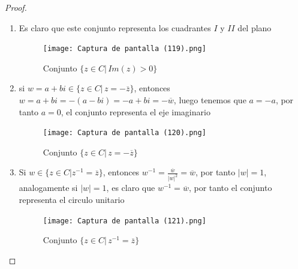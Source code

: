 \documentclass[11pt,letterpaper]{article}
\begin{document}
\begin{proof}\,\\
    \begin{enumerate}
        \item Es claro que este conjunto representa los cuadrantes $I$ y $II$ del plano
    \begin{figure}[htb]
    \centering
    \texttt{[image: Captura de pantalla (119).png]}
    \caption{Conjunto $\{z\in C|\,Im(z)>0\}$}
    \label{Cono rebanado}
\end{figure}
\item si $w=a+bi\in \{z\in C|\,z=-\overline{z}\}$, entonces $w=a+bi=-(a-bi)=-a+bi=-\overline{w}$, luego tenemos que $a=-a$, por tanto $a=0$,
el conjunto representa el eje imaginario
\begin{figure}[htb]
    \centering
    \texttt{[image: Captura de pantalla (120).png]}
    \caption{Conjunto $\{z\in C|\,z=-\overline{z}\}$ }
    \label{Cono rebanado}
\end{figure}
\newpage
\item Si $w\in\{z\in C|z^{-1}=\overline{z}\}$, entonces $w^{-1}=\frac{\overline{w}}{|w|^2}=\overline{w}$, por tanto
$|w|=1$, analogamente si $|w|=1$, es claro que $w^{-1}=\overline{w}$, por tanto el conjunto representa el circulo unitario
\begin{figure}[htb]
    \centering
    \texttt{[image: Captura de pantalla (121).png]}
    \caption{Conjunto $\{z\in C|\,z^{-1}=\overline{z}\}$ }
    \label{Cono rebanado}
\end{figure}
\end{enumerate}
    
\end{proof}
\end{document}
